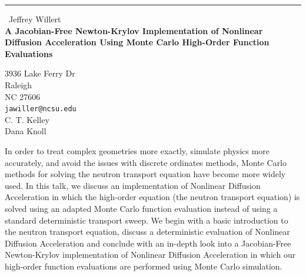 \documentclass{report}
\begin{document}
\begin{center}
\rule{6in}{1pt} \
{\large Jeffrey Willert \\
{\bf A Jacobian-Free Newton-Krylov Implementation of Nonlinear Diffusion Acceleration Using Monte Carlo High-Order Function Evaluations}}

3936 Lake Ferry Dr \\ Raleigh \\ NC 27606
\\
{\tt jawiller@ncsu.edu}\\
C. T. Kelley\\
Dana Knoll\end{center}

In order to treat complex geometries more exactly, simulate physics more
accurately, and avoid the issues with discrete ordinates methods, Monte
Carlo methods for solving the neutron transport equation have become more
widely used. In this talk, we discuss an implementation of Nonlinear
Diffusion Acceleration in which the high-order equation (the neutron
transport equation) is solved using an adapted Monte Carlo function
evaluation instead of using a standard deterministic transport sweep. We
begin with a basic introduction to the neutron transport equation,
discuss a deterministic evaluation of Nonlinear Diffusion Acceleration
and conclude with an in-depth look into a Jacobian-Free Newton-Krylov
implementation of Nonlinear Diffusion Acceleration in which our
high-order function evaluations are performed using Monte Carlo
simulation.
\end{document}
